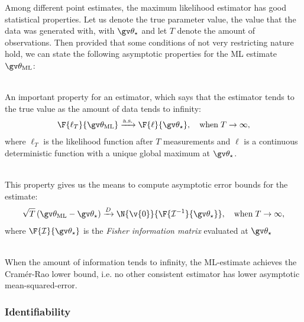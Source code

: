 Among different point estimates, the maximum likelihood estimator has good statistical properties.
Let us denote the true parameter value, the value that the data was generated with, with $\Th_\star$ and 
let $T$ denote the amount of observations.
Then provided that some conditions of not very restricting nature hold, we can state the following asymptotic properties 
for the ML estimate $\Th_{\text{ML}}$:
\begin{description}
\addtolength{\leftskip}{1cm}
\item[Strong consistency]\hfill\\
An important property for an estimator, which says that
the estimator tends to the true value as the amount of data tends to infinity:
\begin{align}
	\F{\ell_T}{\Th_{\text{ML}}} \xrightarrow{\mathrm{a.s.}} \F{\ell}{\Th_\star},\quad \mathrm{when}\;T\to\infty,
\end{align}
where $\ell_T$ is the likelihood function after $T$ measurements and $\ell$ is a continuous
deterministic function with a unique global maximum at $\Th_\star$.
\item[Asymptotic normality]\hfill\\
This property gives us the means to compute asymptotic error bounds for
the estimate:
\begin{align}
	\sqrt{T}\left(\Th_{\text{ML}}-\Th_\star\right) \xrightarrow{D} \N{\v{0}}{\F{\mathcal{I}^{-1}}{\Th_\star}},\quad \mathrm{when}\;T\to\infty,
	\label{tablelabel}
\end{align}
where $\F{\mathcal{I}}{\Th_\star}$ is the \emph{Fisher information matrix} evaluated at $\Th_\star$ 
\item[Efficiency]\hfill\\
When the amount of information tends to infinity, the ML-estimate achieves
the Cramér-Rao lower bound, i.e. no other consistent estimator has lower asymptotic mean-squared-error.
\end{description}


\subsubsection{Identifiability}


